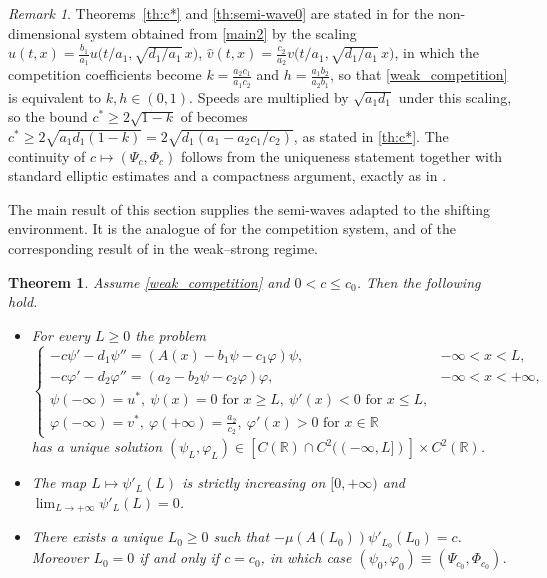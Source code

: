 \documentclass[reqno]{amsart}
\theoremstyle{plain}
\newtheorem{theorem}{Theorem}
\theoremstyle{definition}
\theoremstyle{remark}
\newtheorem{remark}{Remark}
\begin{document}
\begin{remark}\label{rm:convert}
	Theorems~\ref{th:c*} and \ref{th:semi-wave0} are stated in \cite{MR3986328}
	for the non-dimensional system obtained from \eqref{main2} by the scaling
	$\hat u(t,x)=\frac{b_1}{a_1}u\big(t/a_1,\sqrt{d_1/a_1}\,x\big)$,
	$\hat v(t,x)=\frac{c_2}{a_2}v\big(t/a_1,\sqrt{d_1/a_1}\,x\big)$, in which the
	competition coefficients become $k=\frac{a_2c_1}{a_1c_2}$ and
	$h=\frac{a_1b_2}{a_2b_1}$, so that \eqref{weak_competition} is equivalent to
	$k,h\in(0,1)$. Speeds are multiplied by $\sqrt{a_1d_1}$ under this scaling,
	so the bound $c^*\ge2\sqrt{1-k}$ of \cite[Proposition 1.4]{MR3986328} becomes
	$c^*\ge2\sqrt{a_1d_1(1-k)}=2\sqrt{d_1(a_1-a_2c_1/c_2)}$, as stated in
	\cref{th:c*}. The continuity of $c\mapsto(\Psi_c,\Phi_c)$ follows from the
	uniqueness statement together with standard elliptic estimates and a
	compactness argument, exactly as in \cite[Theorem 1.3(ii)]{MR3609207}.
\end{remark}

The main result of this section supplies the semi-waves adapted to the shifting
environment. It is the analogue of \cite[Proposition 1.1]{HU20205931} for the
competition system, and of the corresponding result of \cite{DLN2026a} in the
weak--strong regime.

\begin{theorem}\label{th:semi-wave}
	Assume \eqref{weak_competition} and $0<c\le c_0$. Then the following hold.
	\begin{itemize}
		\item[(i)] For every $L\ge0$ the problem
		\begin{equation}\label{eqlm1}
			\begin{cases}
				-c \psi' - d_1 \psi'' = (A(x) - b_1\psi - c_1\varphi)\psi, & -\infty < x < L,\\
				-c \varphi' - d_2 \varphi'' = (a_2 - b_2\psi - c_2\varphi)\varphi, & -\infty < x < +\infty,\\
				\psi(-\infty) = u^*, ~ \psi(x)=0 \text{ for } x\ge L, ~ \psi'(x)<0 \text{ for } x\le L,\\
				\varphi(-\infty) = v^*, ~ \varphi(+\infty)=\frac{a_2}{c_2}, ~ \varphi'(x)>0 \text{ for } x\in \mathbb{R}
			\end{cases}
		\end{equation}
		has a unique solution
		$(\psi_L,\varphi_L) \in [C(\mathbb{R})\cap C^2((-\infty, L])] \times C^2(\mathbb{R})$.
		\item[(ii)] The map $L \mapsto \psi'_L(L)$ is strictly increasing on
		$[0, +\infty)$ and $\lim_{L\to+\infty}\psi'_L(L)=0$.
		\item[(iii)] There exists a unique $L_0 \geq 0$ such that
		$-\mu(A(L_0))\psi'_{L_0}(L_0) = c$. Moreover $L_0 = 0$ if and only if
		$c = c_0$, in which case $(\psi_0,\varphi_0) \equiv (\Psi_{c_0}, \Phi_{c_0})$.
	\end{itemize}
\end{theorem}
\end{document}

